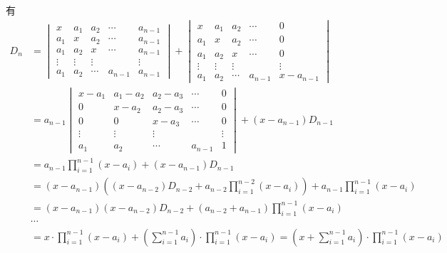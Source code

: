 有
\begin{align*}
D_n & = \begin{vmatrix}
x & a_1 & a_2 & \cdots & a_{n-1} \\ a_1 & x & a_2 & \cdots & a_{n-1} \\ a_1 & a_2 & x & \cdots & a_{n-1} \\ \vdots & \vdots & \vdots & & \vdots \\ a_1 & a_2 & \cdots & a_{n-1} & a_{n-1}
\end{vmatrix} + \begin{vmatrix}
x & a_1 & a_2 & \cdots & 0 \\ a_1 & x & a_2 & \cdots & 0 \\ a_1 & a_2 & x & \cdots & 0 \\ \vdots & \vdots & \vdots & & \vdots \\ a_1 & a_2 & \cdots & a_{n-1} & x-a_{n-1} \end{vmatrix} \\
& = a_{n-1} \begin{vmatrix}
x-a_1 & a_1-a_2 & a_2-a_3 & \cdots & 0 \\ 0 & x-a_2 & a_2-a_3 & \cdots & 0 \\ 0 & 0 & x-a_3 & \cdots & 0 \\ \vdots & \vdots & \vdots & & \vdots \\ a_1 & a_2 & \cdots & a_{n-1} & 1
\end{vmatrix} + (x-a_{n-1}) D_{n-1} \\
& = a_{n-1} \prod_{i=1}^{n-1}(x-a_i) + (x-a_{n-1}) D_{n-1} \\
& = (x-a_{n-1}) \left( (x-a_{n-2})D_{n-2} + a_{n-2}\prod_{i=1}^{n-2}(x-a_i) \right) + a_{n-1} \prod_{i=1}^{n-1}(x-a_i) \\
& = (x-a_{n-1})(x-a_{n-2})D_{n-2} + (a_{n-2} + a_{n-1}) \prod_{i=1}^{n-1}(x-a_i) \\
& \cdots \\
& = x \cdot \prod_{i=1}^{n-1}(x-a_i) + \left( \sum_{i=1}^{n-1} a_i \right) \cdot \prod_{i=1}^{n-1}(x-a_i) = \left(x + \sum_{i=1}^{n-1} a_i \right) \cdot \prod_{i=1}^{n-1}(x-a_i)
\end{align*}


